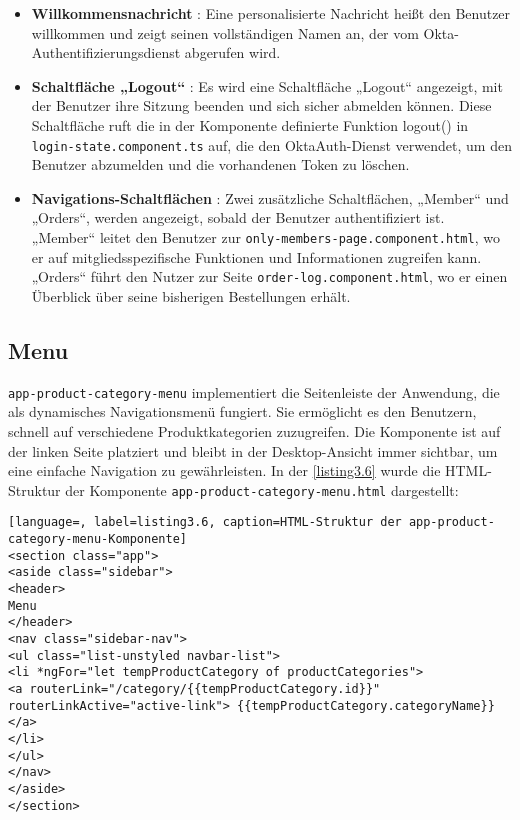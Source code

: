 \begin{itemize}
	\item \textbf{Willkommensnachricht} : Eine personalisierte Nachricht heißt den Benutzer willkommen und zeigt seinen vollständigen Namen an, der vom Okta-Authentifizierungsdienst abgerufen wird.
	\item \textbf{Schaltfläche „Logout“} : Es wird eine Schaltfläche „Logout“ angezeigt, mit der Benutzer ihre Sitzung beenden und sich sicher abmelden können. Diese Schaltfläche ruft die in der Komponente definierte Funktion logout() in \verb*|login-state.component.ts| auf, die den OktaAuth-Dienst verwendet, um den Benutzer abzumelden und die vorhandenen Token zu löschen. 
	\item \textbf{Navigations-Schaltflächen} : Zwei zusätzliche Schaltflächen, „Member“ und „Orders“, werden angezeigt, sobald der Benutzer authentifiziert ist.\\ 
	„Member“ leitet den Benutzer zur \verb*|only-members-page.component.html|, wo er auf mitgliedsspezifische Funktionen und Informationen zugreifen kann.\\
	„Orders“ führt den Nutzer zur Seite \verb*|order-log.component.html|, wo er einen Überblick über seine bisherigen Bestellungen erhält.
\end{itemize}

\subsection{Menu}

\verb*|app-product-category-menu| implementiert die Seitenleiste der Anwendung, die als dynamisches Navigationsmenü fungiert. Sie ermöglicht es den Benutzern, schnell auf verschiedene Produktkategorien zuzugreifen. Die Komponente ist auf der linken Seite platziert und bleibt in der Desktop-Ansicht immer sichtbar, um eine einfache Navigation zu gewährleisten. In der \ref{listing3.6} wurde die HTML-Struktur der Komponente \verb*|app-product-category-menu.html| dargestellt:

\begin{lstlisting}[language=, label=listing3.6, caption=HTML-Struktur der app-product-category-menu-Komponente]
<section class="app">
<aside class="sidebar">
<header>
Menu
</header>
<nav class="sidebar-nav">
<ul class="list-unstyled navbar-list">
<li *ngFor="let tempProductCategory of productCategories">
<a routerLink="/category/{{tempProductCategory.id}}" 
routerLinkActive="active-link"> {{tempProductCategory.categoryName}}
</a>
</li>
</ul>
</nav>
</aside>
</section>
\end{lstlisting}


